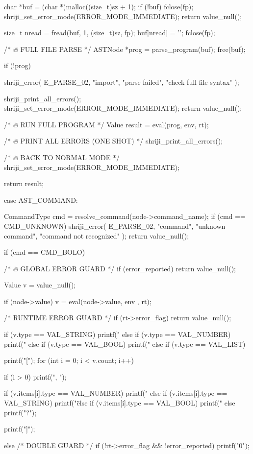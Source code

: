 \documentclass{article}
\begin{document}
{{{    char *buf = (char *)malloc((size_t)sz + 1);
    if (!buf) {
        fclose(fp);
        shriji_set_error_mode(ERROR_MODE_IMMEDIATE);
        return value_null();
    }

    size_t nread = fread(buf, 1, (size_t)sz, fp);
    buf[nread] = '\0';
    fclose(fp);

    /* 🔥 FULL FILE PARSE */
    ASTNode *prog = parse_program(buf);
    free(buf);

    if (!prog) {
        shriji_error(
            E_PARSE_02,
            "import",
            "parse failed",
            "check full file syntax"
        );

        shriji_print_all_errors();
        shriji_set_error_mode(ERROR_MODE_IMMEDIATE);
        return value_null();
    }

    /* 🔥 RUN FULL PROGRAM */
    Value result = eval(prog, env, rt);

    /* 🔥 PRINT ALL ERRORS (ONE SHOT) */
    shriji_print_all_errors();

    /* 🔥 BACK TO NORMAL MODE */
    shriji_set_error_mode(ERROR_MODE_IMMEDIATE);

    return result;
}

case AST_COMMAND: {

    CommandType cmd = resolve_command(node->command_name);
    if (cmd == CMD_UNKNOWN) {
        shriji_error(
            E_PARSE_02,
            "command",
            "unknown command",
            "command not recognized"
        );
        return value_null();
    }

if (cmd == CMD_BOLO) {

    /* 🔥 GLOBAL ERROR GUARD */
    if (error_reported) {
        return value_null();
    }

    Value v = value_null();

    if (node->value)
        v = eval(node->value, env , rt);

/*  RUNTIME ERROR GUARD */
if (rt->error_flag) {
    return value_null();
}

if (v.type == VAL_STRING) {
    printf("%
}
else if (v.type == VAL_NUMBER) {
    printf("%
}
else if (v.type == VAL_BOOL) {
    printf("%
}
else if (v.type == VAL_LIST) {
    printf("[");
    for (int i = 0; i < v.count; i++) {
        if (i > 0) printf(", ");

        if (v.items[i].type == VAL_NUMBER)
            printf("%
        else if (v.items[i].type == VAL_STRING)
            printf("\"%
        else if (v.items[i].type == VAL_BOOL)
            printf("%
        else
            printf("?");
    }
    printf("]\n");
}
else {
    /*  DOUBLE GUARD */
    if (!rt->error_flag && !error_reported) {
        printf("0\n");
    }
}



}}}}
\end{document}
